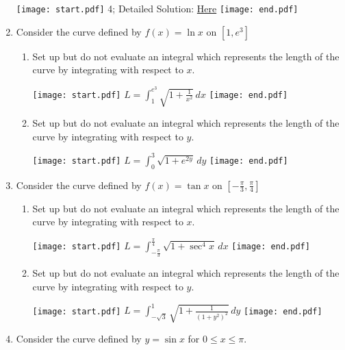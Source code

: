 \documentclass[12pt]{article}
\begin{document}
\begin{enumerate}
\texttt{[image: start.pdf]}
{{4; Detailed Solution: \textcolor{blue}{\href{http://www.math.drexel.edu/classes/Calculus/resources/Math122HW/Solutions/122_09_Arc_Length_05.pdf}{Here}}}}
\texttt{[image: end.pdf]}


\item Consider the curve defined by $f(x)=\ln{x}$ on $\left[1,e^3\right]$

\begin{enumerate}

\item Set up but do not evaluate an integral which represents the length of the curve by integrating with respect to $x$.

\texttt{[image: start.pdf]}
{{$L=\int_1^{e^3} \sqrt{1+\frac{1}{x^2}} \,dx$}}
\texttt{[image: end.pdf]}


\item Set up but do not evaluate an integral which represents the length of the curve by integrating with respect to $y$.

\texttt{[image: start.pdf]}
{{$L=\int_0^3 \sqrt{1+e^{2y}} \,dy$}}
\texttt{[image: end.pdf]}


\end{enumerate}

\item Consider the curve defined by $f(x)=\tan{x}$ on $\left[-\frac{\pi}{3},\frac{\pi}{4}\right]$

\begin{enumerate}

\item Set up but do not evaluate an integral which represents the length of the curve by integrating with respect to $x$.

\texttt{[image: start.pdf]}
{{$L=\int_{-\frac{\pi}{3}}^{\frac{\pi}{4}} \sqrt{1+\sec^4{x}} \,dx$}}
\texttt{[image: end.pdf]}


\item Set up but do not evaluate an integral which represents the length of the curve by integrating with respect to $y$.

\texttt{[image: start.pdf]}
{{$L=\int_{-\sqrt{3}}^{1} \sqrt{1+\frac{1}{(1+y^2)^2}} \,dy$}}
\texttt{[image: end.pdf]}


\end{enumerate}

\item Consider the curve defined by $y=\sin{x}$ for $0 \leq x \leq \pi$.

\begin{enumerate}


\end{enumerate}
\end{enumerate}
\end{document}
